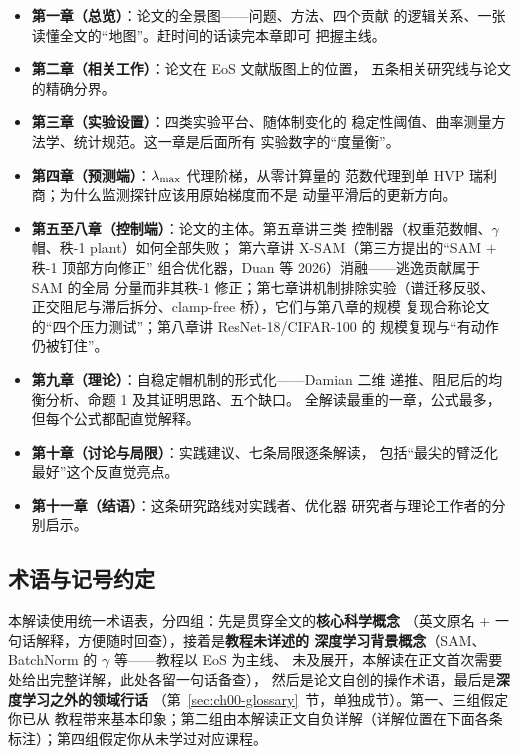 \begin{itemize}
  \item \textbf{第一章（总览）}：论文的全景图——问题、方法、四个贡献
        的逻辑关系、一张读懂全文的``地图''。赶时间的话读完本章即可
        把握主线。
  \item \textbf{第二章（相关工作）}：论文在 EoS 文献版图上的位置，
        五条相关研究线与论文的精确分界。
  \item \textbf{第三章（实验设置）}：四类实验平台、随体制变化的
        稳定性阈值、曲率测量方法学、统计规范。这一章是后面所有
        实验数字的``度量衡''。
  \item \textbf{第四章（预测端）}：$\lambda_{\max}$ 代理阶梯，从零计算量的
        范数代理到单 HVP 瑞利商；为什么监测探针应该用原始梯度而不是
        动量平滑后的更新方向。
  \item \textbf{第五至八章（控制端）}：论文的主体。第五章讲三类
        控制器（权重范数帽、$\gamma$ 帽、秩-1 plant）如何全部失败；
        第六章讲 X-SAM（第三方提出的``SAM $+$ 秩-1 顶部方向修正''
        组合优化器，Duan 等 2026）消融——逃逸贡献属于 SAM 的全局
        分量而非其秩-1 修正；第七章讲机制排除实验（谱迁移反驳、
        正交阻尼与滞后拆分、clamp-free 桥），它们与第八章的规模
        复现合称论文的``四个压力测试''；第八章讲 ResNet-18/CIFAR-100 的
        规模复现与``有动作仍被钉住''。
  \item \textbf{第九章（理论）}：自稳定帽机制的形式化——Damian 二维
        递推、阻尼后的均衡分析、命题 1 及其证明思路、五个缺口。
        全解读最重的一章，公式最多，但每个公式都配直觉解释。
  \item \textbf{第十章（讨论与局限）}：实践建议、七条局限逐条解读，
        包括``最尖的臂泛化最好''这个反直觉亮点。
  \item \textbf{第十一章（结语）}：这条研究路线对实践者、优化器
        研究者与理论工作者的分别启示。
\end{itemize}

\subsection{术语与记号约定}

本解读使用统一术语表，分四组：先是贯穿全文的\textbf{核心科学概念}
（英文原名 + 一句话解释，方便随时回查），接着是\textbf{教程未详述的
深度学习背景概念}（SAM、BatchNorm 的 $\gamma$ 等——教程以 EoS 为主线、
未及展开，本解读在正文首次需要处给出完整详解，此处各留一句话备查），
然后是论文自创的操作术语，最后是\textbf{深度学习之外的领域行话}
（第~\ref{sec:ch00-glossary}~节，单独成节）。第一、三组假定你已从
教程带来基本印象；第二组由本解读正文自负详解（详解位置在下面各条
标注）；第四组假定你从未学过对应课程。

